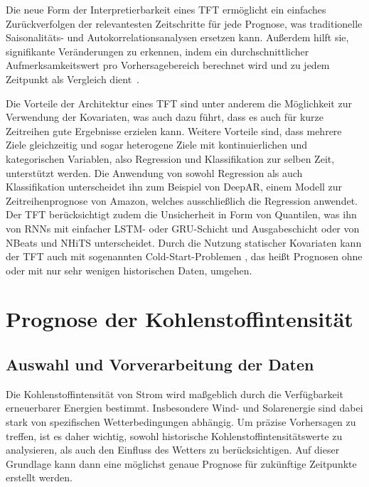 Die neue Form der Interpretierbarkeit eines \ac{TFT} ermöglicht ein einfaches Zurückverfolgen der relevantesten Zeitschritte für jede Prognose, was traditionelle Saisonalitäts- und Autokorrelationsanalysen ersetzen kann.
Außerdem hilft sie, signifikante Veränderungen zu erkennen, indem ein durchschnittlicher Aufmerksamkeitswert pro Vorhersagebereich berechnet wird und zu jedem Zeitpunkt als Vergleich dient~\cite{Labiadh.2023}.

Die Vorteile der Architektur eines \ac{TFT} sind unter anderem die Möglichkeit zur Verwendung der Kovariaten, was auch dazu führt, dass es auch für kurze Zeitreihen gute Ergebnisse erzielen kann.
Weitere Vorteile sind, dass mehrere Ziele gleichzeitig und sogar heterogene Ziele mit kontinuierlichen und kategorischen Variablen, also Regression und Klassifikation zur selben Zeit, unterstützt werden.
Die Anwendung von sowohl Regression als auch Klassifikation unterscheidet ihn zum Beispiel von DeepAR, einem Modell zur Zeitreihenprognose von Amazon, welches ausschließlich die Regression anwendet.
Der \ac{TFT} berücksichtigt zudem die Unsicherheit in Form von Quantilen, was ihn von \acp{RNN} mit einfacher \ac{LSTM}- oder \ac{GRU}-Schicht und Ausgabeschicht oder von NBeats und NHiTS unterscheidet.
Durch die Nutzung statischer Kovariaten kann der \ac{TFT} auch mit sogenannten \glqq Cold-Start-Problemen \grqq{}, das heißt Prognosen ohne oder mit nur sehr wenigen historischen Daten, umgehen.

\chapter{Prognose der Kohlenstoffintensität}\label{CAP:prediction}
\section{Auswahl und Vorverarbeitung der Daten}\label{CAP:data-preparation-analysis}
Die Kohlenstoffintensität von Strom wird maßgeblich durch die Verfügbarkeit erneuerbarer Energien bestimmt.
Insbesondere Wind- und Solarenergie sind dabei stark von spezifischen Wetterbedingungen abhängig.
Um präzise Vorhersagen zu treffen, ist es daher wichtig, sowohl historische Kohlenstoffintensitätswerte zu analysieren, als auch den Einfluss des Wetters zu berücksichtigen.
Auf dieser Grundlage kann dann eine möglichst genaue Prognose für zukünftige Zeitpunkte erstellt werden.

